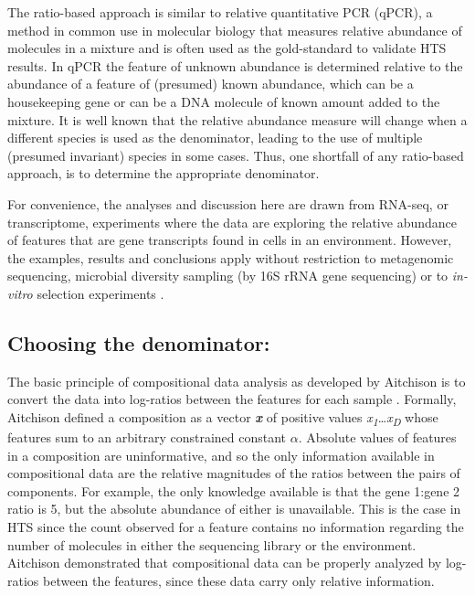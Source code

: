 \documentclass{bmcart}
\begin{document}
The ratio-based approach is  similar to relative quantitative PCR (qPCR), a method in common use in molecular biology that measures relative abundance of molecules in a mixture \cite{Thellin:1999aa,Vandesompele:2002aa} and is often used as the gold-standard to validate HTS results. In qPCR the feature of unknown abundance is determined relative to the abundance of a feature of (presumed) known abundance, which can be a housekeeping gene or can be a DNA molecule of known amount added to the mixture. It is well known that the relative abundance measure will change when a different species is used as the denominator, leading to the use of multiple (presumed invariant) species in some cases. Thus, one shortfall of any ratio-based approach, is to determine the appropriate denominator. 


For convenience, the analyses and discussion here are drawn from RNA-seq, or transcriptome, experiments where the data are exploring the relative abundance of features that are gene transcripts found in cells in an environment. However, the examples, results and conclusions apply without restriction to metagenomic sequencing, microbial diversity sampling (by 16S rRNA gene sequencing) or to \textit{in-vitro} selection experiments \cite{fernandes:2014,mcmurrough:2014}. 

\subsection*{Choosing the denominator:}

The basic principle of compositional data analysis as developed by Aitchison is to convert the data into log-ratios between the features for each sample \cite{Aitchison:1986}. Formally, Aitchison defined a composition as a vector \textit{\textbf{x}}  of positive values \textit{x\textsubscript{1}}\ldots\textit{x\textsubscript{D}} whose features  sum to an arbitrary constrained constant $\alpha$. Absolute values of features in a composition are uninformative, and so the only information available in compositional data are the relative magnitudes of the ratios between the pairs of components. For example, the only knowledge available is that the gene 1:gene 2 ratio is 5, but the absolute abundance of either is unavailable. This is the case in HTS since the count observed for a feature contains no information regarding the number of molecules in either the sequencing library or the environment. Aitchison demonstrated that compositional data  can be properly analyzed by log-ratios between the features, since these data carry only relative information\cite{Aitchison:1986}.
\end{document}
